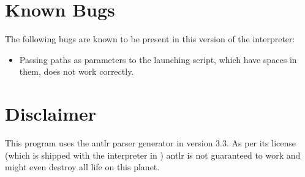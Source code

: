 \section{Known Bugs}
The following bugs are known to be present in this version of the interpreter:

\begin{itemize}
	\item Passing paths as parameters to the \setlX{} launching script, which have spaces in them, does not work correctly.
\end{itemize}

\section{Disclaimer}
This program uses the antlr parser generator in version 3.3. As per its license (which is shipped with the interpreter in ) antlr is not guaranteed to work and might even destroy all life on this planet.


